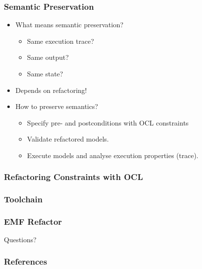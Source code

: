 \documentclass{beamer}
\begin{document}
\begin{frame}
\frametitle{Semantic Preservation}
\begin{itemize}
 \item What means semantic preservation?
 \begin{itemize}
  \item Same execution trace?
  \item Same output?
  \item Same state?
 \end{itemize}
 \item Depends on refactoring!
 \item How to preserve semantics?
 \begin{itemize}
  \item Specify pre- and postconditions with OCL constraints
  \item Validate refactored models.
  \item Execute models and analyse execution properties (trace).
 \end{itemize}
\end{itemize}

\end{frame}
        
\begin{frame}
\frametitle{Refactoring Constraints with OCL}

\end{frame}
        
\begin{frame}
\frametitle{Toolchain}
        
\end{frame}
        
\begin{frame}
\frametitle{EMF Refactor}
        
\end{frame}
        

\begin{frame}
 \begin{center}
\Huge Questions?
\end{center}
\end{frame}

\begin{frame}
 \frametitle{References}
 
 
\end{frame}
\end{document}

